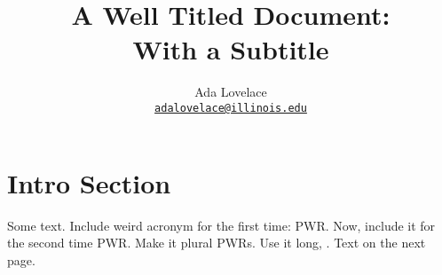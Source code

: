\documentclass[letterpaper]{article}
\author{Ada Lovelace
        \\ \href{mailto:adalovelace@illinois.edu}{\texttt{adalovelace@illinois.edu}}
}
\date{}
\title{A Well Titled Document:\\
With a Subtitle}
\begin{document}
\maketitle
\section{Intro Section}
Some text. Include weird acronym for the first time: \gls{PWR}.
Now, include it for the second time \gls{PWR}.
Make it plural \glspl{PWR}.
Use it long, .
\pagebreak
Text on the next page.




\end{document}

